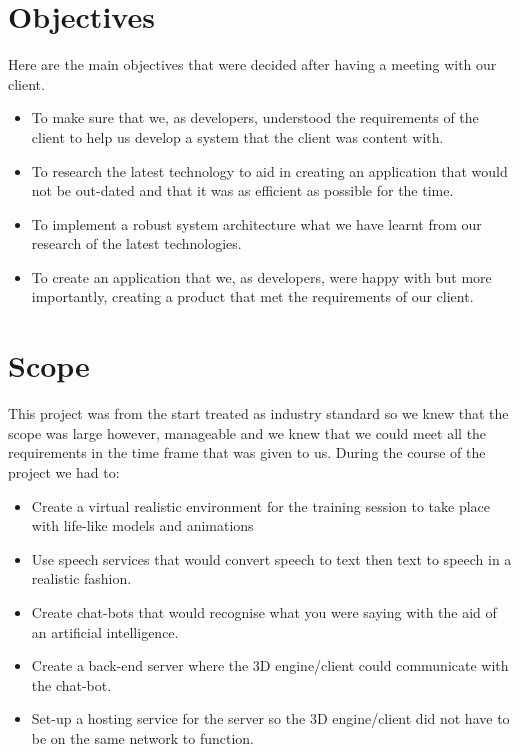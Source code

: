\section{Objectives}
Here are the main objectives that were decided after having a meeting with our client.

\begin{itemize}
    \item To make sure that we, as developers, understood the requirements of the client to help us develop a system that the client was content with. 
    
    \item To research the latest technology to aid in creating an application that would not be out-dated and that it was as efficient as possible for the time.
    
    \item To implement a robust system architecture what we have learnt from our research of the latest technologies.
    
    \item To create an application that we, as developers, were happy with but more importantly, creating a product that met the requirements of our client.
    
\end{itemize}

\section{Scope}
This project was from the start treated as industry standard so we knew that the scope was large however, manageable and we knew that we could meet all the requirements in the time frame that was given to us. During the course of the project we had to:
\begin{itemize}
    \item Create a virtual realistic environment for the training session to take place with life-like models and animations
    
    \item Use speech services that would convert speech to text then text to speech in a realistic fashion.
    
    \item Create chat-bots that would recognise what you were saying with the aid of an artificial intelligence.
    \item Create a back-end server where the 3D engine/client could communicate with the chat-bot.
    
    \item Set-up a hosting service for the server so the 3D engine/client did not have to be on the same network to function.
    
\end{itemize}

